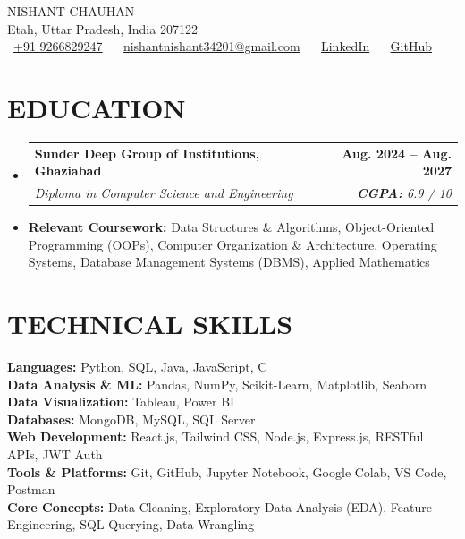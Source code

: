 \documentclass[letterpaper,11pt]{article}
\makeatletter
\newcommand{\resumeSubheading}[4]{
  \vspace{-2pt}\item
    \begin{tabular*}{1.0\textwidth}[t]{l@{\extracolsep{\fill}}r}
      \textbf{#1} & \textbf{\small #2} \\
      \textit{\small#3} & \textit{\small #4} \\
    \end{tabular*}\vspace{-6pt}
}
\newcommand{\resumeSubHeadingListStart}{\begin{itemize}[leftmargin=0.0in, label={}]}
\newcommand{\resumeSubHeadingListEnd}{\end{itemize}}
\makeatother
\begin{document}
\begin{center}
    {\Huge \scshape NISHANT CHAUHAN} \\ \vspace{3pt}
    \small Etah, Uttar Pradesh, India 207122 \\ \vspace{4pt}
    \color{Blue}
    \faPhone\ \href{tel:+919266829247}{+91 9266829247} ~ 
    \faEnvelope\ \href{mailto:nishantnishant34201@gmail.com}{nishantnishant34201@gmail.com} ~ 
    \faLinkedin\ \href{https://www.linkedin.com/in/vineet-chauhan-8a79ab37b/}{LinkedIn} ~
    \faGithub\ \href{https://github.com/Vineet-2028}{GitHub}
\end{center}
\vspace{-12pt}

\section{EDUCATION}
  \resumeSubHeadingListStart
    \resumeSubheading
      {Sunder Deep Group of Institutions, Ghaziabad}{Aug. 2024 -- Aug. 2027}
      {Diploma in Computer Science and Engineering}{\textbf{CGPA:} 6.9 / 10}
  \resumeSubHeadingListEnd
  \vspace{-6pt}
  \begin{itemize}[leftmargin=0.10in, label={}]
    \item \small{\textbf{Relevant Coursework:} Data Structures \& Algorithms, Object-Oriented Programming (OOPs), Computer Organization \& Architecture, Operating Systems, Database Management Systems (DBMS), Applied Mathematics}
  \end{itemize}
\vspace{-10pt}

\section{TECHNICAL SKILLS}
\begin{itemize}[leftmargin=0.15in, label={}]
  \small{\item{
    \textbf{Languages:} Python, SQL, Java, JavaScript, C \\
    \textbf{Data Analysis \& ML:} Pandas, NumPy, Scikit-Learn, Matplotlib, Seaborn \\
    \textbf{Data Visualization:} Tableau, Power BI \\
    \textbf{Databases:} MongoDB, MySQL, SQL Server \\
    \textbf{Web Development:} React.js, Tailwind CSS, Node.js, Express.js, RESTful APIs, JWT Auth \\
    \textbf{Tools \& Platforms:} Git, GitHub, Jupyter Notebook, Google Colab, VS Code, Postman \\
    \textbf{Core Concepts:} Data Cleaning, Exploratory Data Analysis (EDA), Feature Engineering, SQL Querying, Data Wrangling
  }}
\end{itemize}
\vspace{-10pt}
\end{document}
